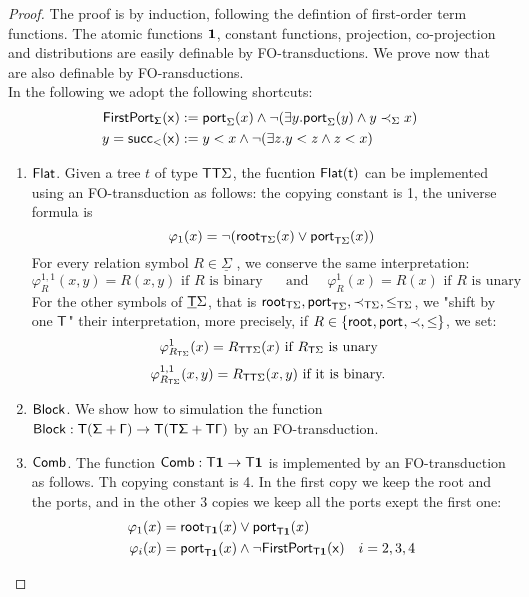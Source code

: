 \begin{proof}
The proof is by induction, following the defintion of first-order term functions. The atomic functions $\mathbf{1}$, constant functions, projection, co-projection and distributions are easily definable by FO-transductions.  
We prove now that are also definable by FO-ransductions. 
\\

In the following we adopt the following shortcuts:
\begin{align*}
\sf{FirstPort}_\Sigma (x)& := \mathsf{port}_{\Sigma}(x)\wedge \neg (\exists y. \mathsf{port}_{\Sigma}(y)\wedge y\prec_\Sigma x)\\
y=\sf{succ}_< (x) &:=  y<x \wedge \neg (\exists z. y<z \wedge z<x)
\end{align*} 
\begin{enumerate}
\item $\sf{Flat}$. Given a tree $t$ of type $\mathsf T\mathsf T\Sigma$, the fucntion $\sf{Flat}(t)$ can be implemented using an FO-transduction as follows: the copying constant is 1, the universe formula is 
\[\varphi_1(x) = \neg (\mathsf{root}_{\mathsf T\Sigma}(x) \vee \mathsf{port}_{\mathsf T\Sigma}(x) )  \]
For every relation symbol $R\in\underline \Sigma$ , we conserve the same interpretation:
\[\varphi_R^{1,1}(x,y)=R(x,y) \text{ if $R$ is binary }
\quad \text{ and } \quad\varphi_R^{1}(x)=R(x) \text{ if $R$ is unary }\] 
For the other symbols of $\underline{\mathsf T}\Sigma$, that is $\mathsf{root}_{\mathsf T\Sigma},\mathsf{port}_{\mathsf T\Sigma}, \prec_{\mathsf T\Sigma}, \leq_{\mathsf T\Sigma}$, we "shift by one $\mathsf T$" their interpretation, more precisely, if $R\in\{\mathsf{root}_{}, \mathsf{port}_{}, \prec, \leq\}$, we set:
\[ \varphi^1_{R_{\mathsf T\Sigma}}(x) = R_{\mathsf T\mathsf T\Sigma}(x) \text{ if $R_{\mathsf T\Sigma}$ is unary } \]
\[\varphi^{1,1}_{R_{\mathsf T\Sigma}}(x,y) = R_{\mathsf T\mathsf T\Sigma}(x,y) \text{ if it is binary. }\] 
\item $\sf{Block}$. We show how to simulation the function $\sf{Block}:\mathsf T (\Sigma + \Gamma) \to \mathsf T (\mathsf T \Sigma + \mathsf T \Gamma)$ by an FO-transduction. 
\item $\sf{Comb}$. The function $\sf{Comb}:\mathsf T \mathbf{1}\to\mathsf T\mathbf{1}$ is implemented by an FO-transduction as follows. Th copying constant is 4. 
In the first copy we keep the root and the ports, and in the other 3 copies we keep all the ports exept the first one:
\begin{align*}
\varphi_1(x)&=\mathsf{root}_{\mathsf T\mathbf{1}}(x) \vee \mathsf{port}_{\mathsf T\mathbf{1}}(x)\\
\varphi_i(x)&=\mathsf{port}_{\mathsf T\mathbf{1}}(x)\wedge \neg \sf{FirstPort}_{\mathsf T\mathbf{1}}(x)& i=2,3,4
\end{align*}


\end{enumerate}
\end{proof}

